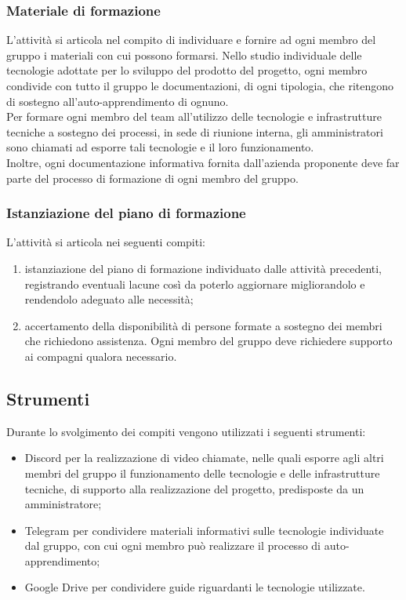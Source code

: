 \subsubsection{Materiale di formazione}
L'attività si articola nel compito di individuare e fornire ad ogni membro del gruppo i materiali con cui possono formarsi. Nello studio individuale delle tecnologie adottate per lo sviluppo del prodotto del progetto, ogni membro condivide con tutto il gruppo le documentazioni, di ogni tipologia, che ritengono di sostegno all'auto-apprendimento di ognuno.\\Per formare ogni membro del team all'utilizzo delle tecnologie e  infrastrutture tecniche a sostegno dei processi, in sede di riunione interna, gli amministratori sono chiamati ad esporre tali tecnologie e il loro funzionamento.\\Inoltre, ogni documentazione informativa fornita dall'azienda proponente deve far parte del processo di formazione di ogni membro del gruppo.
\subsubsection{Istanziazione del piano di formazione}
L'attività si articola nei seguenti compiti:
\begin{enumerate}
    \item istanziazione del piano di formazione individuato dalle attività precedenti, registrando eventuali lacune così da poterlo aggiornare migliorandolo e rendendolo adeguato alle necessità;
    \item accertamento della disponibilità di persone formate a sostegno dei membri che richiedono assistenza. Ogni membro del gruppo deve richiedere supporto ai compagni qualora necessario.
\end{enumerate}
\subsection{Strumenti}
Durante lo svolgimento dei compiti vengono utilizzati i seguenti strumenti:
\begin{itemize}
    \item Discord per la realizzazione di video chiamate, nelle quali esporre agli altri membri del gruppo il funzionamento delle tecnologie e delle infrastrutture tecniche, di supporto alla realizzazione del progetto, predisposte da un amministratore;
    \item Telegram per condividere materiali informativi sulle tecnologie individuate dal gruppo, con cui ogni membro può realizzare il processo di auto-apprendimento;
    \item Google Drive per condividere guide riguardanti le tecnologie utilizzate.
\end{itemize}